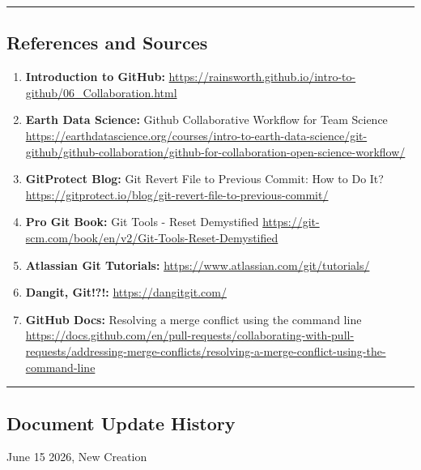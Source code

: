 \documentclass[
]{article}
\providecommand{\tightlist}{%
  \setlength{\itemsep}{0pt}\setlength{\parskip}{0pt}}
\begin{document}
\begin{center}\rule{0.5\linewidth}{0.5pt}\end{center}

\subsection{References and Sources}\label{references-and-sources}

\begin{enumerate}
\def\labelenumi{\arabic{enumi}.}
\tightlist
\item
  \textbf{Introduction to GitHub:}
  \url{https://rainsworth.github.io/intro-to-github/06_Collaboration.html}
\item
  \textbf{Earth Data Science:} Github Collaborative Workflow for Team
  Science
  \url{https://earthdatascience.org/courses/intro-to-earth-data-science/git-github/github-collaboration/github-for-collaboration-open-science-workflow/}
\item
  \textbf{GitProtect Blog:} Git Revert File to Previous Commit: How to
  Do It?
  \url{https://gitprotect.io/blog/git-revert-file-to-previous-commit/}
\item
  \textbf{Pro Git Book:} Git Tools - Reset Demystified
  \url{https://git-scm.com/book/en/v2/Git-Tools-Reset-Demystified}
\item
  \textbf{Atlassian Git Tutorials:}
  \url{https://www.atlassian.com/git/tutorials/}
\item
  \textbf{Dangit, Git!?!:} \url{https://dangitgit.com/}
\item
  \textbf{GitHub Docs:} Resolving a merge conflict using the command
  line
  \url{https://docs.github.com/en/pull-requests/collaborating-with-pull-requests/addressing-merge-conflicts/resolving-a-merge-conflict-using-the-command-line}
\end{enumerate}

\begin{center}\rule{0.5\linewidth}{0.5pt}\end{center}

\subsection{Document Update History}\label{document-update-history}

June 15 2026, New Creation
\end{document}

